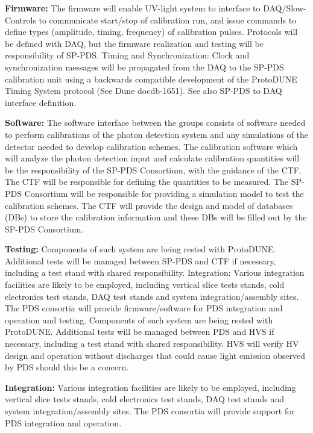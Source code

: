 \textbf{Firmware:} The firmware will enable UV-light system to interface to DAQ/Slow-Controls to communicate start/stop of calibration run, and issue commands to define types (amplitude, timing, frequency) of calibration pulses. Protocols will be defined with DAQ, but the firmware realization and testing will be responsibility of SP-PDS. 
Timing and Synchronization: Clock and synchronization messages will be propagated from the DAQ to the SP-PDS calibration unit using a backwards compatible development of the ProtoDUNE Timing System protocol (See Dune docdb-1651). See also SP-PDS to DAQ interface definition.

\textbf{Software:} The software interface between the groups consists of software needed to perform calibrations of the photon detection system and any simulations of the detector needed to develop calibration schemes. The calibration software which will analyze the photon detection input and calculate calibration quantities will be the responsibility of the SP-PDS Consortium, with the guidance of the CTF. The CTF will be responsible for defining the quantities to be measured. The SP-PDS Consortium will be responsible for providing a simulation model to test the calibration schemes. The CTF will provide the design and model of databases (DBs) to store the calibration information and these DBs will be filled out by the SP-PDS Consortium.

\textbf{Testing: }Components of such system are being rested with ProtoDUNE. Additional tests will be managed between SP-PDS and CTF if necessary, including a test stand with shared responsibility.
Integration: Various integration facilities are likely to be employed, including vertical slice tests stands, cold electronics test stands, DAQ test stands and system integration/assembly sites. The PDS consortia will provide firmware/software for PDS integration and operation and testing. Components of such system are being rested with ProtoDUNE. Additional tests will be managed between PDS and HVS if necessary, including a test stand with shared responsibility. HVS will verify HV design and operation without discharges that could cause light emission observed by PDS should this be a concern.

\textbf{Integration: } Various integration facilities are likely to be employed, including vertical slice tests stands, cold electronics test stands, DAQ test stands and system integration/assembly sites. The PDS consortia will provide support for PDS integration and operation.

